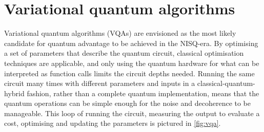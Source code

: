 \section{Variational quantum algorithms}
\label{sec:vqa}
Variational quantum algorithms (VQAs) are envisioned as the most likely candidate for quantum advantage to be achieved in the NISQ-era.
By optimising a set of parameters that describe the quantum circuit, classical optimisation techniques are applicable, and only using the quantum hardware for what can be interpreted as function calls limits the circuit depths needed.
Running the same circuit many times with different parameters and inputs in a classical-quantum-hybrid fashion, rather than a complete quantum implementation, means that the quantum operations can be simple enough for the noise and decoherence to be manageable.
This loop of running the circuit, measuring the output to evaluate a cost, optimising and updating the parameters is pictured in \cref{fig:vqa}.

